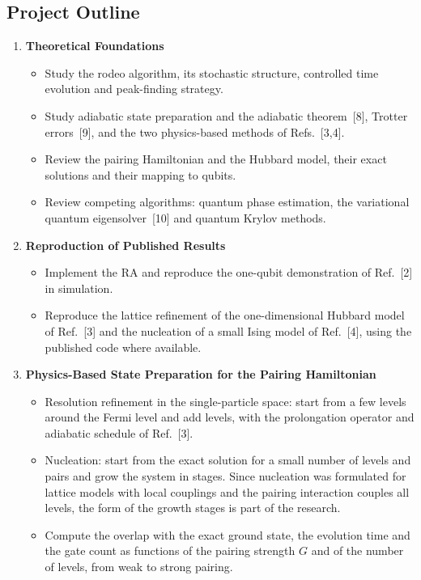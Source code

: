 \documentclass[12pt,a4paper]{article}
\begin{document}
\subsection*{Project Outline}

\begin{enumerate}

\item \textbf{Theoretical Foundations}
  \begin{itemize}
    \item Study the rodeo algorithm, its stochastic structure, controlled time evolution and peak-finding strategy.
    \item Study adiabatic state preparation and the adiabatic theorem~[8], Trotter errors~[9], and the two physics-based methods of Refs.~[3,4].
    \item Review the pairing Hamiltonian and the Hubbard model, their exact solutions and their mapping to qubits.
    \item Review competing algorithms: quantum phase estimation, the variational quantum eigensolver~[10] and quantum Krylov methods.
  \end{itemize}

\item \textbf{Reproduction of Published Results}
  \begin{itemize}
    \item Implement the RA and reproduce the one-qubit demonstration of Ref.~[2] in simulation.
    \item Reproduce the lattice refinement of the one-dimensional Hubbard model of Ref.~[3] and the nucleation of a small Ising model of Ref.~[4], using the published code where available.
  \end{itemize}

\item \textbf{Physics-Based State Preparation for the Pairing Hamiltonian}
  \begin{itemize}
    \item Resolution refinement in the single-particle space: start from a few levels around the Fermi level and add levels, with the prolongation operator and adiabatic schedule of Ref.~[3].
    \item Nucleation: start from the exact solution for a small number of levels and pairs and grow the system in stages.  Since nucleation was formulated for lattice models with local couplings and the pairing interaction couples all levels, the form of the growth stages is part of the research.
    \item Compute the overlap with the exact ground state, the evolution time and the gate count as functions of the pairing strength $G$ and of the number of levels, from weak to strong pairing.
  \end{itemize}


\end{enumerate}
\end{document}
